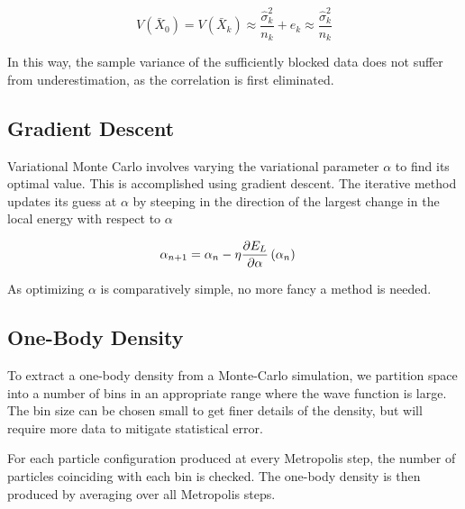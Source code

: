 \begin{equation}\label{eq:trunc}
V(\bar{X}_0) = V(\bar{X}_k) \approx \frac{\hat{\sigma}_k^2}{n_k} +  e_k \approx \frac{\hat{\sigma}_k^2}{n_k}
\end{equation}

In this way, the sample variance of the sufficiently blocked data does not suffer from underestimation, as the correlation is first eliminated. 
  

\subsection{Gradient Descent}
Variational Monte Carlo involves varying the variational parameter \(\alpha\)
to find its optimal value. This is accomplished using gradient descent. The
iterative method updates its guess at \(\alpha\) by steeping in the direction of
the largest change in the local energy with respect to \(\alpha\)

\begin{align*}
  \alpha_{n+1} &= \alpha_{n} - \eta\pdv{E_{L}}{\alpha}\left( \alpha_{n} \right)
\end{align*}

As optimizing \(\alpha\) is comparatively simple, no more fancy a method is
needed.

\subsection{One-Body Density}
To extract a one-body density from a Monte-Carlo simulation, we partition space into a number of bins in an appropriate range where the wave function is large. The bin size can be chosen small to get finer details of the density, but will require more data to mitigate statistical error.

For each particle configuration produced at every Metropolis step, the number of particles coinciding with each bin is checked. The one-body density is then produced by averaging over all Metropolis steps.


